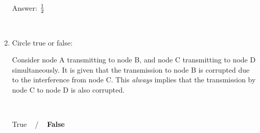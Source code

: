 \documentclass[letterpaper, 12pt]{article}
\begin{document}
\begin{enumerate}
~


Answer: $1 \over 2$


~



\item 
Circle true or false:

Consider node A transmitting to node B, and node C transmitting to
    node D simultaneously. It is given that the transmission to node B
    is corrupted due to the interference from node C. This {\em always} implies that
    the transmission by node C to node D is also corrupted.

~ 

True ~ / ~ \textbf{False}


\end{enumerate}

\pagebreak
\end{document}
